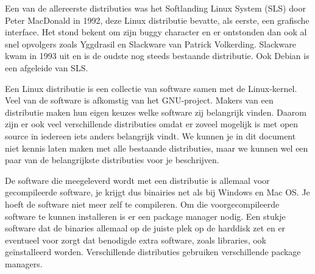 Een van de allereerste distributies was het Softlanding Linux System (SLS) door Peter MacDonald in 1992, deze Linux distributie bevatte, als eerste, een grafische interface. Het stond bekent om zijn buggy character en er ontstonden dan ook al snel opvolgers zoals Yggdrasil en Slackware van Patrick Volkerding. Slackware kwam in 1993 uit en is de oudste nog steeds bestaande distributie. Ook Debian is een afgeleide van SLS.

Een Linux distributie is een collectie van software samen met de Linux-kernel. Veel van de software is afkomstig van het GNU-project. Makers van een distributie maken hun eigen keuzes welke software zij belangrijk vinden. Daarom zijn er ook veel verschillende distributies omdat er zoveel mogelijk is met open source in iedereen iets anders belangrijk vindt. We kunnen je in dit document niet kennis laten maken met alle bestaande distributies, maar we kunnen wel een paar van de belangrijkste distributies voor je beschrijven.

De software die meegeleverd wordt met een distributie is allemaal voor gecompileerde software, je krijgt dus binairies net als bij Windows en Mac OS. Je hoeft de software niet meer zelf te compileren. Om die voorgecompileerde software te kunnen installeren is er een package manager nodig. Een stukje software dat de binaries allemaal op de juiste plek op de harddisk zet en er eventueel voor zorgt dat benodigde extra software, zoals libraries, ook ge\"installeerd worden. Verschillende distributies gebruiken verschillende package managers.
